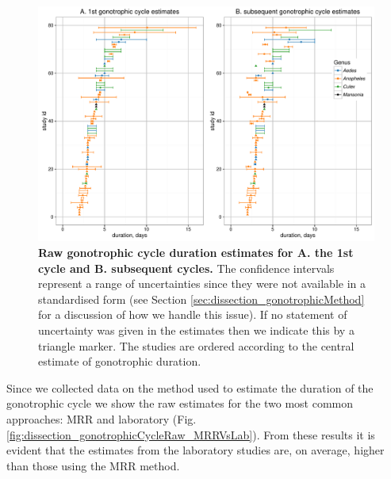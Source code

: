 \documentclass[12pt]{article}
\begin{document}
{\begin{figure}[ht]
	\centerline{\includegraphics[width=1\textwidth]{./Figure_files/dissection_gonotrophicCycleRaw.pdf}}
	\caption{\textbf{Raw gonotrophic cycle duration estimates for A. the 1st cycle and B. subsequent cycles.} The confidence intervals represent a range of uncertainties since they were not available in a standardised form (see Section \ref{sec:dissection_gonotrophicMethod} for a discussion of how we handle this issue). If no statement of uncertainty was given in the estimates then we indicate this by a triangle marker. The studies are ordered according to the central estimate of gonotrophic duration.}\label{fig:dissection_gonotrophicCycleRaw}
\end{figure}

Since we collected data on the method used to estimate the duration of the gonotrophic cycle we show the raw estimates for the two most common approaches: MRR and laboratory (Fig. \ref{fig:dissection_gonotrophicCycleRaw_MRRVsLab}). From these results it is evident that the estimates from the laboratory studies are, on average, higher than those using the MRR method.

}
\end{document}
